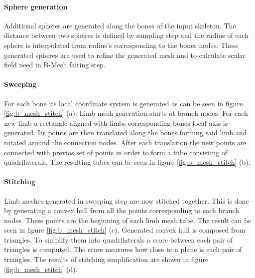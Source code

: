 \paragraph{Sphere generation}
Additional spheres are generated along the bones of the input skeleton. The distance between two spheres is defined by sampling step and the radius of each sphere is interpolated from radius's corresponding to the bones nodes. These generated spheres are used to refine the generated mesh and to calculate scalar field need in B-Mesh fairing step.

\paragraph{Sweeping}
For each bone its local coordinate system is generated as can be seen in figure \ref{fig:b_mesh_stitch} (a). Limb mesh generation starts at branch nodes. For each new limb a rectangle aligned with limbs corresponding bones local axis is generated. Its points are then translated along the bones forming said limb and rotated around the connection nodes. After each translation the new points are connected with previos set of points in order to form a tube consisting of quadrilaterals. The resulting tubes can be seen in figure \ref{fig:b_mesh_stitch} (b).

\paragraph{Stitching}
Limb meshes generated in sweeping step are now stitched together. This is done by generating a convex hull from all the points corresponding to each branch nodes. These points are the beginning of each limb mesh tube. The result can be seen in figure \ref{fig:b_mesh_stitch} (c). Generated convex hull is composed from triangles. To simplify them into quadrilaterals a score between each pair of triangles is computed. The score measures how close to a plane is each pair of triangles. The results of stitching simplification are shown in figure \ref{fig:b_mesh_stitch} (d).

